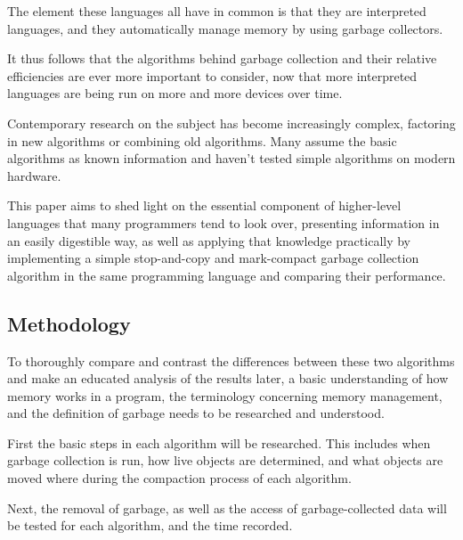 \documentclass[index]{subfiles}
\begin{document}
The element these languages all have in common is that they are interpreted languages, and they automatically manage memory by using garbage collectors.

It thus follows that the algorithms behind garbage collection and their relative efficiencies are ever more important to consider, now that more interpreted languages are being run on more and more devices over time. %

Contemporary research on the subject has become increasingly complex, factoring in new algorithms or combining old algorithms. Many assume the basic algorithms as known information and haven't tested simple algorithms on modern hardware.

This paper aims to shed light on the essential component of higher-level languages that many programmers tend to look over, presenting information in an easily digestible way, as well as applying that knowledge practically by implementing a simple stop-and-copy and mark-compact garbage collection algorithm in the same programming language and comparing their performance.

\subsection{Methodology}

To thoroughly compare and contrast the differences between these two algorithms and make an educated analysis of the results later, a basic understanding of how memory works in a program, the terminology concerning memory management, and the definition of garbage needs to be researched and understood.

First the basic steps in each algorithm will be researched. This includes when garbage collection is run, how live objects are determined, and what objects are moved where during the compaction process of each algorithm.

Next, the removal of garbage, as well as the access of garbage-collected data will be tested for each algorithm, and the time recorded.
\end{document}
